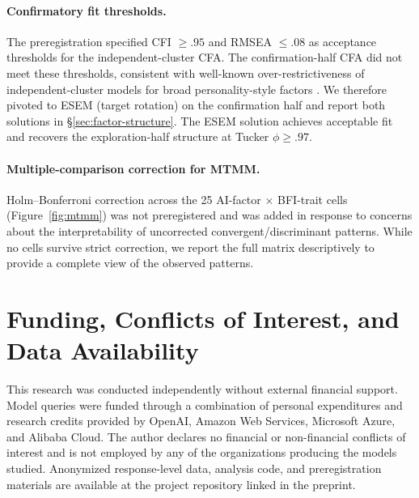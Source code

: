 \documentclass[11pt]{article}
\begin{document}
\paragraph{Confirmatory fit thresholds.}
The preregistration specified CFI $\geq .95$ and RMSEA $\leq .08$ as acceptance thresholds for the independent-cluster CFA. The confirmation-half CFA did not meet these thresholds, consistent with well-known over-restrictiveness of independent-cluster models for broad personality-style factors \citep{marsh2014exploratory}. We therefore pivoted to ESEM (target rotation) on the confirmation half and report both solutions in \S\ref{sec:factor-structure}. The ESEM solution achieves acceptable fit and recovers the exploration-half structure at Tucker $\phi \geq .97$.

\paragraph{Multiple-comparison correction for MTMM.}
Holm--Bonferroni correction across the 25 AI-factor $\times$ BFI-trait cells (Figure~\ref{fig:mtmm}) was not preregistered and was added in response to  concerns about the interpretability of uncorrected convergent/discriminant patterns. While no cells survive strict correction, we report the full matrix descriptively to provide a complete view of the observed patterns.

\section*{Funding, Conflicts of Interest, and Data Availability}
This research was conducted independently without external financial support. Model queries were funded through a combination of personal expenditures and research credits provided by OpenAI, Amazon Web Services, Microsoft Azure, and Alibaba Cloud. The author declares no financial or non-financial conflicts of interest and is not employed by any of the organizations producing the models studied. Anonymized response-level data, analysis code, and preregistration materials are available at the project repository linked in the preprint.







\appendix
\end{document}
